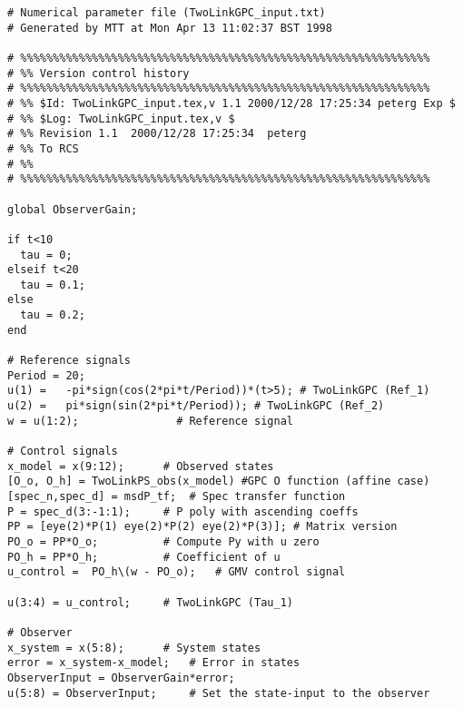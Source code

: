 \begin{verbatim}
# Numerical parameter file (TwoLinkGPC_input.txt)
# Generated by MTT at Mon Apr 13 11:02:37 BST 1998

# %%%%%%%%%%%%%%%%%%%%%%%%%%%%%%%%%%%%%%%%%%%%%%%%%%%%%%%%%%%%%%%
# %% Version control history
# %%%%%%%%%%%%%%%%%%%%%%%%%%%%%%%%%%%%%%%%%%%%%%%%%%%%%%%%%%%%%%%
# %% $Id: TwoLinkGPC_input.tex,v 1.1 2000/12/28 17:25:34 peterg Exp $
# %% $Log: TwoLinkGPC_input.tex,v $
# %% Revision 1.1  2000/12/28 17:25:34  peterg
# %% To RCS
# %%
# %%%%%%%%%%%%%%%%%%%%%%%%%%%%%%%%%%%%%%%%%%%%%%%%%%%%%%%%%%%%%%%

global ObserverGain;

if t<10
  tau = 0;
elseif t<20
  tau = 0.1;
else
  tau = 0.2;
end

# Reference signals
Period = 20;
u(1) =	 -pi*sign(cos(2*pi*t/Period))*(t>5); # TwoLinkGPC (Ref_1)
u(2) =	 pi*sign(sin(2*pi*t/Period)); # TwoLinkGPC (Ref_2)
w = u(1:2);			      # Reference signal

# Control signals
x_model = x(9:12);		# Observed states
[O_o, O_h] = TwoLinkPS_obs(x_model) #GPC O function (affine case)
[spec_n,spec_d] = msdP_tf;	# Spec transfer function
P = spec_d(3:-1:1);		# P poly with ascending coeffs
PP = [eye(2)*P(1) eye(2)*P(2) eye(2)*P(3)]; # Matrix version
PO_o = PP*O_o;			# Compute Py with u zero
PO_h = PP*O_h;			# Coefficient of u
u_control =  PO_h\(w - PO_o);	# GMV control signal

u(3:4) = u_control;		# TwoLinkGPC (Tau_1)

# Observer
x_system = x(5:8);		# System states
error = x_system-x_model;	# Error in states
ObserverInput = ObserverGain*error;
u(5:8) = ObserverInput;		# Set the state-input to the observer

\end{verbatim}
